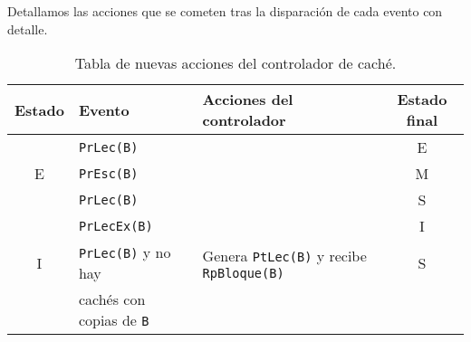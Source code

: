 Detallamos las acciones que se cometen tras la disparación de cada evento con detalle.

\begin{table}
\centering
\begin{tabular}{c l l c}
    \toprule
    Estado & Evento & Acciones del controlador & Estado final \\
    \toprule
       & \verb|PrLec(B)| & & E \\
    \midrule
    E  & \verb|PrEsc(B)| & & M \\
    \midrule
       & \verb|PrLec(B)| & & S \\
    \midrule
       & \verb|PrLecEx(B)| & & I \\
    \bottomrule
    I & \verb|PrLec(B)| y no hay & Genera \verb|PtLec(B)| y recibe \verb|RpBloque(B)| & S \\
      & cachés con copias de \verb|B| & & \\
    \bottomrule
\end{tabular}
\caption{Tabla de nuevas acciones del controlador de caché.}
\label{tab:acciones_controlador_MESI}
\end{table}


